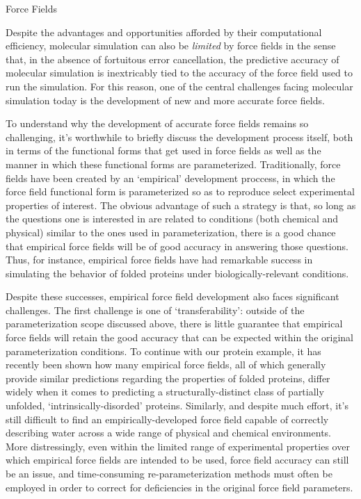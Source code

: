 \begin{section}{Force Fields}

Despite the advantages and opportunities afforded by their computational efficiency, molecular
simulation can also be \emph{limited} by force fields in the sense that, in
the absence of fortuitous error cancellation, the predictive accuracy of
molecular simulation is inextricably tied to the accuracy of the force field
used to run the simulation. For this reason, one of the central challenges
facing molecular simulation today is the development of new and more accurate
force fields.\cite{Freddolino2010,Ballone2014}

To understand why the development of accurate force fields remains so
challenging, it's worthwhile to briefly discuss the development process
itself, both in terms of the functional forms that get used in force fields as
well as the manner in which these functional forms are parameterized.
Traditionally, force fields have been created by an `empirical' development
proccess,\cite{Stone2007}
in which the force field functional form is parameterized so as to reproduce
select experimental properties of interest. The obvious advantage of such a
strategy is that, so long as the questions one is interested in are related to
conditions (both chemical and physical) similar to the ones used in parameterization,
there is a good chance that empirical force fields will be of good accuracy in
answering those questions. Thus, for instance, empirical force fields have had
remarkable success in simulating the behavior of folded proteins under biologically-relevant conditions.
\cite{Caleman2011,Piana2014,Lopes2015} 

Despite these successes, empirical force field development also faces
significant challenges. The first challenge is one of `transferability':
outside of the parameterization scope discussed above,
there is little
guarantee that empirical force fields will retain 
the good accuracy that can be expected within the original parameterization
conditions.
\cite{Hornak2006,Freddolino2010}
To continue with our protein example, it has recently been shown how many
empirical force fields, all of which generally provide similar predictions
regarding the properties of folded proteins, differ widely when it comes to
predicting a structurally-distinct class of partially unfolded,
`intrinsically-disorded' proteins.
\cite{Rauscher2015,Piana2014}
Similarly, and despite much effort, it's still difficult to find an
empirically-developed force field capable of correctly describing
water across a wide range of physical and chemical environments.
\cite{Cisneros2016a,Jorgensen2005}
More distressingly, even within the limited range of experimental properties over which empirical
force fields are intended to be used, force field accuracy can still be an
issue, and time-consuming re-parameterization methods must often be employed
in order to correct for deficiencies in the original force field parameters.
\cite{Hornak2006,Freddolino2010}


\end{section}
